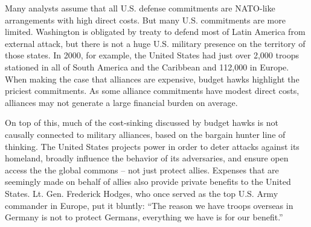 Many analysts assume that all U.S. defense commitments are NATO-like arrangements with high direct costs. But many U.S. commitments are more limited. Washington is obligated by treaty to defend most of Latin America from external attack, but there is not a huge U.S. military presence on the territory of those states. In 2000, for example, the United States had just over 2,000 troops stationed in all of South America and the Caribbean and 112,000 in Europe.\autocite{kaneglobal04}  When making the case that alliances are expensive, budget hawks highlight the priciest commitments. As some alliance commitments have modest direct costs, alliances may not generate a large financial burden on average. %

On top of this, much of the cost-sinking discussed by budget hawks is not causally connected to military alliances, based on the bargain hunter line of thinking. The United States projects power in order to deter attacks against its homeland, broadly influence the behavior of its adversaries, and ensure open access the the global commons -- not just protect allies. Expenses that are seemingly made on behalf of allies also provide private benefits to the United States. Lt. Gen. Frederick Hodges, who once served as the top U.S. Army commander in Europe, put it bluntly: ``The reason we have troops overseas in Germany is not to protect Germans, everything we have is for our benefit.''\autocite[Quoted in][]{crowleyNYT20} 

